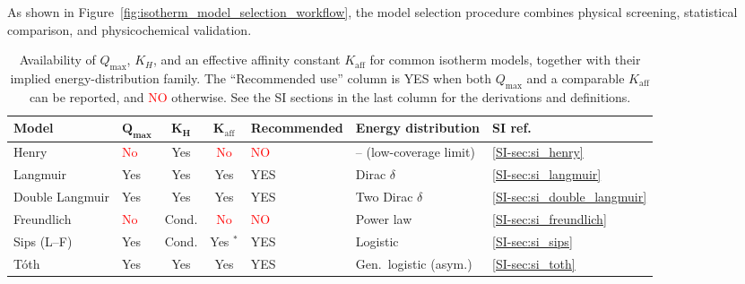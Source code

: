 \documentclass[journal=jacsat,manuscript=article]{achemso}
\begin{document}
	As shown in Figure~\ref{fig:isotherm_model_selection_workflow}, the model selection procedure combines physical screening, statistical comparison, and physicochemical validation.
	
	\newpage

	\begin{table}[H]
		\small
		\caption{Availability of $Q_{\max}$, $K_H$, and an effective affinity constant $K_{\mathrm{aff}}$ for common isotherm models, together with their implied energy-distribution family. The ``Recommended use'' column is \textcolor{green!50!black}{YES} when both $Q_{\max}$ and a comparable $K_{\mathrm{aff}}$ can be reported, and \textcolor{red}{NO} otherwise. See the SI sections in the last column for the derivations and definitions.}
		\label{tab:isotherm_availability}
		\renewcommand{\arraystretch}{1.2}
		\begin{tabular}{@{} p{2.0cm} p{1.0cm} c c p{3.0cm} p{3.8cm} p{1.8cm} @{}}
			\hline
			\textbf{Model}
			& $\boldsymbol{Q_{\max}}$
			& $\boldsymbol{K_H}$
			& $\boldsymbol{K_{\mathrm{aff}}}$
			& \textbf{Recommended}
			& \textbf{Energy distribution}
			& \textbf{SI ref.} \\
			\hline
			Henry
			& \textcolor{red}{No} & \textcolor{green!50!black}{Yes} & \textcolor{red}{No}
			& \textcolor{red}{NO}
			& -- (low-coverage limit)
			& \ref{SI-sec:si_henry} \\
			Langmuir
			& \textcolor{green!50!black}{Yes} & \textcolor{green!50!black}{Yes} & \textcolor{green!50!black}{Yes}
			& \textcolor{green!50!black}{YES}
			& Dirac $\delta$
			& \ref{SI-sec:si_langmuir} \\
			Double Langmuir
			& \textcolor{green!50!black}{Yes} & \textcolor{green!50!black}{Yes} & \textcolor{green!50!black}{Yes}
			& \textcolor{green!50!black}{YES}
			& Two Dirac $\delta$
			& \ref{SI-sec:si_double_langmuir} \\
			Freundlich
			& \textcolor{red}{No} & \textcolor{orange!80!black}{Cond.} & \textcolor{red}{No}
			& \textcolor{red}{NO}
			& Power law %
			& \ref{SI-sec:si_freundlich} \\
			Sips (L--F)
			& \textcolor{green!50!black}{Yes} & \textcolor{orange!80!black}{Cond.} & \textcolor{green!50!black}{Yes} $^*$
			& \textcolor{green!50!black}{YES}
			& Logistic
			& \ref{SI-sec:si_sips} \\
			T\'{o}th
			& \textcolor{green!50!black}{Yes} & \textcolor{green!50!black}{Yes} & \textcolor{green!50!black}{Yes}
			& \textcolor{green!50!black}{YES}
			& Gen.\ logistic (asym.)
			& \ref{SI-sec:si_toth} \\

\end{tabular}
\end{table}
\end{document}

